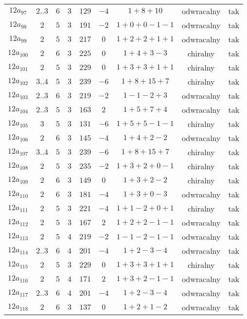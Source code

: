 \begin{longtable}{ccccccccc}
$12a_{97}$ & $2..3$ & $6$ & $3$ & $129$ & $-4$ & $1+8+10$ & odwracalny & tak \\
$12a_{98}$ & $2$ & $5$ & $3$ & $191$ & $-2$ & $1+0+0-1-1$ & odwracalny & tak \\
$12a_{99}$ & $2$ & $5$ & $3$ & $217$ & $0$ & $1+2+2+1+1$ & odwracalny & tak \\
$12a_{100}$ & $2$ & $6$ & $3$ & $225$ & $0$ & $1+4+3-3$ & chiralny & tak \\
$12a_{101}$ & $2$ & $5$ & $3$ & $229$ & $0$ & $1+3+3+1+1$ & chiralny & tak \\
$12a_{102}$ & $3..4$ & $5$ & $3$ & $239$ & $-6$ & $1+8+15+7$ & chiralny & tak \\
$12a_{103}$ & $2..3$ & $6$ & $3$ & $219$ & $-2$ & $1-1-2+3$ & odwracalny & tak \\
$12a_{104}$ & $2..3$ & $5$ & $3$ & $163$ & $2$ & $1+5+7+4$ & odwracalny & tak \\
$12a_{105}$ & $3$ & $5$ & $3$ & $131$ & $-6$ & $1+5+5-1-1$ & chiralny & tak \\
$12a_{106}$ & $2$ & $6$ & $3$ & $145$ & $-4$ & $1+4+2-2$ & odwracalny & tak \\
$12a_{107}$ & $3..4$ & $5$ & $3$ & $239$ & $-6$ & $1+8+15+7$ & chiralny & tak \\
$12a_{108}$ & $2$ & $5$ & $3$ & $235$ & $-2$ & $1+3+2+0-1$ & chiralny & tak \\
$12a_{109}$ & $2$ & $6$ & $3$ & $149$ & $0$ & $1+3+2-2$ & chiralny & tak \\
$12a_{110}$ & $2$ & $6$ & $3$ & $181$ & $-4$ & $1+3+0-3$ & odwracalny & tak \\
$12a_{111}$ & $2$ & $5$ & $3$ & $221$ & $-4$ & $1+1-2+0+1$ & chiralny & tak \\
$12a_{112}$ & $2$ & $5$ & $3$ & $167$ & $2$ & $1+2+2-1-1$ & odwracalny & tak \\
$12a_{113}$ & $2$ & $5$ & $4$ & $219$ & $-2$ & $1-1-2-1-1$ & odwracalny & tak \\
$12a_{114}$ & $2..3$ & $6$ & $4$ & $201$ & $-4$ & $1+2-3-4$ & odwracalny & tak \\
$12a_{115}$ & $2$ & $5$ & $3$ & $229$ & $0$ & $1+3+3+1+1$ & chiralny & tak \\
$12a_{116}$ & $2$ & $5$ & $4$ & $171$ & $2$ & $1+3+2-1-1$ & odwracalny & tak \\
$12a_{117}$ & $2..3$ & $6$ & $4$ & $201$ & $-4$ & $1+2-3-4$ & odwracalny & tak \\
$12a_{118}$ & $2$ & $6$ & $3$ & $137$ & $0$ & $1+2+1-2$ & odwracalny & tak \\

\end{longtable}
